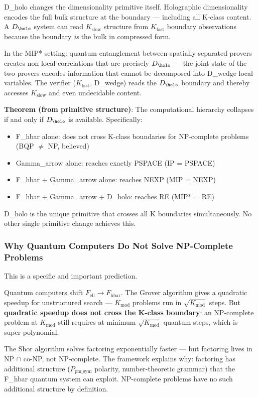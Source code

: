 \documentclass[12pt,a4paper]{article}
\begin{document}
D\_holo changes the dimensionality primitive itself. Holographic dimensionality encodes the full bulk structure at the boundary --- including all K-class content. A $D_{\holo}$ system can read $K_{\text{slow}}$ structure from $K_{\text{fast}}$ boundary observations because the boundary \emph{is} the bulk in compressed form.

In the MIP* setting: quantum entanglement between spatially separated provers creates non-local correlations that are precisely $D_{\holo}$ --- the joint state of the two provers encodes information that cannot be decomposed into D\_wedge local variables. The verifier ($K_{\text{fast}}$, D\_wedge) reads the $D_{\holo}$ boundary and thereby accesses $K_{\text{slow}}$ and even undecidable content.

\textbf{Theorem (from primitive structure)}: The computational hierarchy collapses if and only if $D_{\holo}$ is available. Specifically:

\begin{itemize}
    \item F\_hbar alone: does not cross K-class boundaries for NP-complete problems (BQP $\neq$ NP, believed)
    \item Gamma\_arrow alone: reaches exactly PSPACE (IP = PSPACE)
    \item F\_hbar + Gamma\_arrow alone: reaches NEXP (MIP = NEXP)
    \item F\_hbar + Gamma\_arrow + D\_holo: reaches RE (MIP* = RE)
\end{itemize}

D\_holo is the unique primitive that crosses all K boundaries simultaneously. No other single primitive change achieves this.

\subsubsection{Why Quantum Computers Do Not Solve NP-Complete Problems}

This is a specific and important prediction.

Quantum computers shift $F_{\text{ell}} \to F_{\text{hbar}}$. The Grover algorithm gives a quadratic speedup for unstructured search --- $K_{\text{mod}}$ problems run in $\sqrt{K_{\text{mod}}}$ steps. But \textbf{quadratic speedup does not cross the K-class boundary}: an NP-complete problem at $K_{\text{mod}}$ still requires at minimum $\sqrt{K_{\text{mod}}}$ quantum steps, which is super-polynomial.

The Shor algorithm solves factoring exponentially faster --- but factoring lives in NP $\cap$ co-NP, not NP-complete. The framework explains why: factoring has additional structure ($P_{\text{pm\_sym}}$ polarity, number-theoretic grammar) that the F\_hbar quantum system can exploit. NP-complete problems have no such additional structure by definition.
\end{document}
